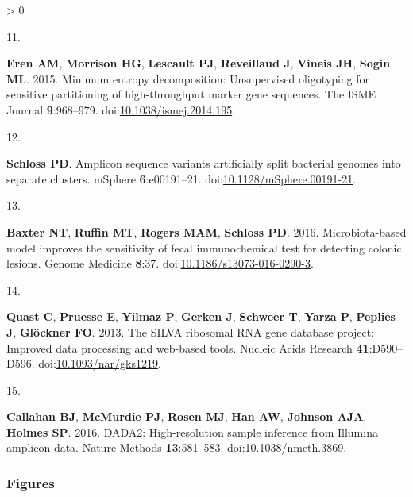 \documentclass[
]{article}
\newlength{\cslhangindent}
\newlength{\csllabelwidth}
\newenvironment{CSLReferences}[2] %
 {%
  \setlength{\parindent}{0pt}
  \ifodd #1 \everypar{\setlength{\hangindent}{\cslhangindent}}\ignorespaces\fi
  \ifnum #2 > 0
  \setlength{\parskip}{#2\baselineskip}
  \fi
 }%
 {}
\newcommand{\CSLLeftMargin}[1]{\parbox[t]{\csllabelwidth}{#1}}
\newcommand{\CSLRightInline}[1]{\parbox[t]{\linewidth - \csllabelwidth}{#1}\break}
\begin{document}
\begin{CSLReferences}{0}{0}
\leavevmode\hypertarget{ref-eren2015}{}%
\CSLLeftMargin{11. }
\CSLRightInline{\textbf{Eren AM}, \textbf{Morrison HG}, \textbf{Lescault
PJ}, \textbf{Reveillaud J}, \textbf{Vineis JH}, \textbf{Sogin ML}. 2015.
Minimum entropy decomposition: Unsupervised oligotyping for sensitive
partitioning of high-throughput marker gene sequences. The ISME Journal
\textbf{9}:968--979.
doi:\href{https://doi.org/10.1038/ismej.2014.195}{10.1038/ismej.2014.195}.}

\leavevmode\hypertarget{ref-schloss}{}%
\CSLLeftMargin{12. }
\CSLRightInline{\textbf{Schloss PD}. Amplicon sequence variants
artificially split bacterial genomes into separate clusters. mSphere
\textbf{6}:e00191--21.
doi:\href{https://doi.org/10.1128/mSphere.00191-21}{10.1128/mSphere.00191-21}.}

\leavevmode\hypertarget{ref-baxter2016}{}%
\CSLLeftMargin{13. }
\CSLRightInline{\textbf{Baxter NT}, \textbf{Ruffin MT}, \textbf{Rogers
MAM}, \textbf{Schloss PD}. 2016. Microbiota-based model improves the
sensitivity of fecal immunochemical test for detecting colonic lesions.
Genome Medicine \textbf{8}:37.
doi:\href{https://doi.org/10.1186/s13073-016-0290-3}{10.1186/s13073-016-0290-3}.}

\leavevmode\hypertarget{ref-quast2013}{}%
\CSLLeftMargin{14. }
\CSLRightInline{\textbf{Quast C}, \textbf{Pruesse E}, \textbf{Yilmaz P},
\textbf{Gerken J}, \textbf{Schweer T}, \textbf{Yarza P}, \textbf{Peplies
J}, \textbf{Glöckner FO}. 2013. The SILVA ribosomal RNA gene database
project: Improved data processing and web-based tools. Nucleic Acids
Research \textbf{41}:D590--D596.
doi:\href{https://doi.org/10.1093/nar/gks1219}{10.1093/nar/gks1219}.}

\leavevmode\hypertarget{ref-callahan2016}{}%
\CSLLeftMargin{15. }
\CSLRightInline{\textbf{Callahan BJ}, \textbf{McMurdie PJ},
\textbf{Rosen MJ}, \textbf{Han AW}, \textbf{Johnson AJA}, \textbf{Holmes
SP}. 2016. DADA2: High-resolution sample inference from Illumina
amplicon data. Nature Methods \textbf{13}:581--583.
doi:\href{https://doi.org/10.1038/nmeth.3869}{10.1038/nmeth.3869}.}

\end{CSLReferences}

\setlength{\parindent}{0in}
\setlength{\leftskip}{0in}

\newpage

\hypertarget{figures}{%
\subsubsection{Figures}\label{figures}}
\end{document}
